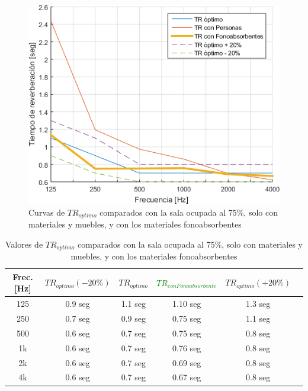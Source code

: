 \begin{figure}[H]
	\centering
	\includegraphics[width=1\textwidth]{./img/TR_conFonoabsorbentes.png}
	\caption{Curvas de $TR_{optimo}$ comparados con la sala ocupada al 75\%, solo con materiales y muebles, y con los materiales fonoabsorbentes}
	\label{fig:TR_fonoabsorbente}
\end{figure}

\begin{table}[H]
    \centering
    \begin{tabular}{|c|c|c|c|c|c|} \hline
        Frec. [Hz] &$TR_{optimo}(-20\%)$& $TR_{optimo}$ & \textcolor{green}{$TR_{conFonoabsorbente}$}& $TR_{optimo}(+20\%)$  \\  \hline
        125 & 0.9 seg & 1.1 seg& 1.10 seg & 1.3 seg  \\ \hline
        250 & 0.7 seg & 0.9 seg& 0.75 seg & 1.1 seg  \\ \hline
        500 & 0.6 seg & 0.7 seg& 0.75 seg & 0.8 seg  \\ \hline
        1k & 0.6 seg & 0.7 seg & 0.76 seg & 0.8 seg  \\ \hline
        2k & 0.6 seg & 0.7 seg & 0.69 seg &0.8 seg  \\ \hline
        4k & 0.6 seg & 0.7 seg & 0.67 seg& 0.8 seg  \\ \hline
    \end{tabular}
    \caption{Valores de $TR_{optimo}$ comparados con la sala ocupada al 75\%, solo con materiales y muebles, y con los materiales fonoabsorbentes}
    \label{tab:TR_fonoabsorbente}
\end{table}

